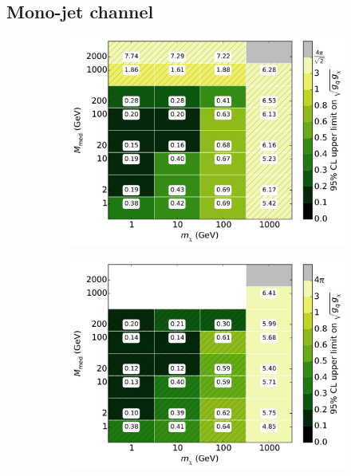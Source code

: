 \subsection{Mono-jet channel}

\begin{figure}[t]
  \centering
    \begin{subfigure}[t]{0.495\textwidth}
      \centering
      \includegraphics[width=1.\textwidth]{figures/grid_basepoints_SVD_rat05_monojet.pdf}
      \caption{}
    \end{subfigure}
    \begin{subfigure}[t]{0.495\textwidth}
      \centering
      \includegraphics[width=1.\textwidth]{figures/grid_basepoints_SVD_rat1_monojet.pdf}

\end{subfigure}
\end{figure}

